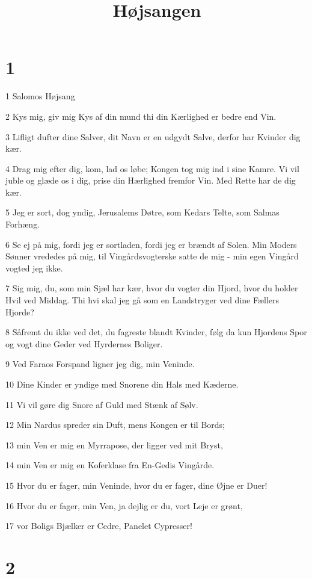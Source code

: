 

\title{Højsangen}


\chapter{1}

\par 1 Salomos Højsang
\par 2 Kys mig, giv mig Kys af din mund thi din Kærlighed er bedre end Vin.
\par 3 Lifligt dufter dine Salver, dit Navn er en udgydt Salve, derfor har Kvinder dig kær.
\par 4 Drag mig efter dig, kom, lad os løbe; Kongen tog mig ind i sine Kamre. Vi vil juble og glæde os i dig, prise din Hærlighed fremfor Vin. Med Rette har de dig kær.
\par 5 Jeg er sort, dog yndig, Jerusalems Døtre, som Kedars Telte, som Salmas Forhæng.
\par 6 Se ej på mig, fordi jeg er sortladen, fordi jeg er brændt af Solen. Min Moders Sønner vrededes på mig, til Vingårdsvogterske satte de mig - min egen Vingård vogted jeg ikke.
\par 7 Sig mig, du, som min Sjæl har kær, hvor du vogter din Hjord, hvor du holder Hvil ved Middag. Thi hvi skal jeg gå som en Landstryger ved dine Fællers Hjorde?
\par 8 Såfremt du ikke ved det, du fagreste blandt Kvinder, følg da kun Hjordens Spor og vogt dine Geder ved Hyrdernes Boliger.
\par 9 Ved Faraos Forspand ligner jeg dig, min Veninde.
\par 10 Dine Kinder er yndige med Snorene din Hals med Kæderne.
\par 11 Vi vil gøre dig Snore af Guld med Stænk af Sølv.
\par 12 Min Nardus spreder sin Duft, mens Kongen er til Bords;
\par 13 min Ven er mig en Myrrapose, der ligger ved mit Bryst,
\par 14 min Ven er mig en Koferklase fra En-Gedis Vingårde.
\par 15 Hvor du er fager, min Veninde, hvor du er fager, dine Øjne er Duer!
\par 16 Hvor du er fager, min Ven, ja dejlig er du, vort Leje er grønt,
\par 17 vor Boligs Bjælker er Cedre, Panelet Cypresser!

\chapter{2}

